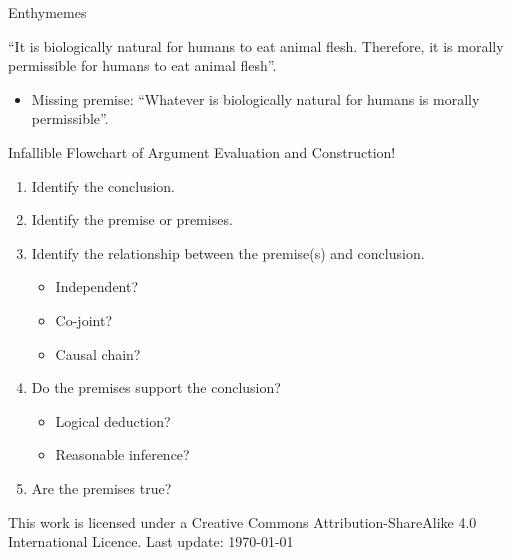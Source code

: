 \documentclass{beamer}
\begin{document}




\begin{frame}{Enthymemes}

``It is biologically natural for humans to eat animal flesh. Therefore, it is morally permissible for humans to eat animal flesh''.

\begin{itemize}
\item Missing premise: ``Whatever is biologically natural for humans is morally permissible''.
\end{itemize}

\end{frame}



\begin{frame}{Infallible Flowchart of Argument Evaluation and Construction!}
\begin{enumerate}
\item Identify the conclusion.
\item Identify the premise or premises.
\item Identify the relationship between the premise(s) and conclusion.
\begin{itemize}
\item Independent?
\item Co-joint?
\item Causal chain?
\end{itemize}
\item Do the premises support the conclusion?
\begin{itemize}
\item Logical deduction?
\item Reasonable inference?
\end{itemize}
\item Are the premises true?
\end{enumerate}

\vspace{12pt}

\tiny
This work is licensed under a Creative Commons Attribution-ShareAlike
4.0 International Licence. Last update: \today

\end{frame}
\end{document}
